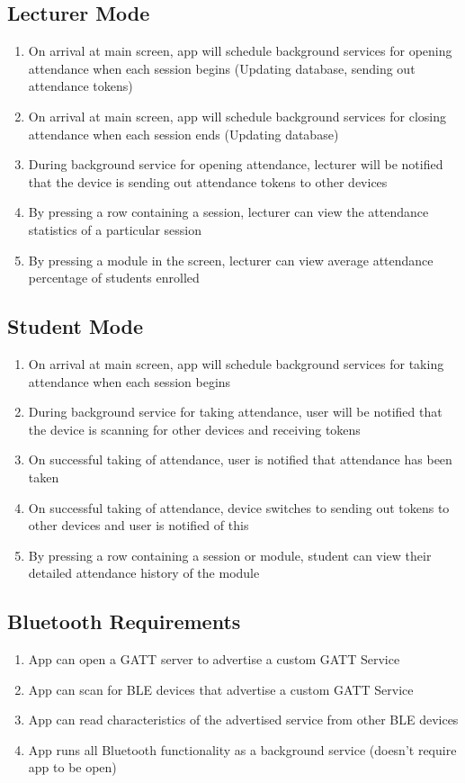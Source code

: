 \documentclass[../report.tex]{subfiles}
\begin{document}
\subsection{Lecturer Mode}
\begin{enumerate}
\item On arrival at main screen, app will schedule background services for opening attendance when each session begins (Updating database, sending out attendance tokens)
\item On arrival at main screen, app will schedule background services for closing attendance when each session ends (Updating database)
\item During background service for opening attendance, lecturer will be notified that the device is sending out attendance tokens to other devices
\item By pressing a row containing a session, lecturer can view the attendance statistics of a particular session
\item By pressing a module in the  screen, lecturer can view average attendance percentage of students enrolled
\end{enumerate}

\subsection{Student Mode}
\begin{enumerate}
\item On arrival at main screen, app will schedule background services for taking attendance when each session begins
\item During background service for taking attendance, user will be notified that the device is scanning for other devices and receiving tokens
\item On successful taking of attendance, user is notified that attendance has been taken
\item On successful taking of attendance, device switches to sending out tokens to other devices and user is notified of this
\item By pressing a row containing a session or module, student can view their detailed attendance history of the module
\end{enumerate}

\subsection{Bluetooth Requirements}
\begin {enumerate}
\item App can open a GATT server to advertise a custom GATT Service
\item App can scan for BLE devices that advertise a custom GATT Service
\item App can read characteristics of the advertised service from other BLE devices
\item App runs all Bluetooth functionality as a background service (doesn’t require app to be open)
\end{enumerate}
\end{document}
